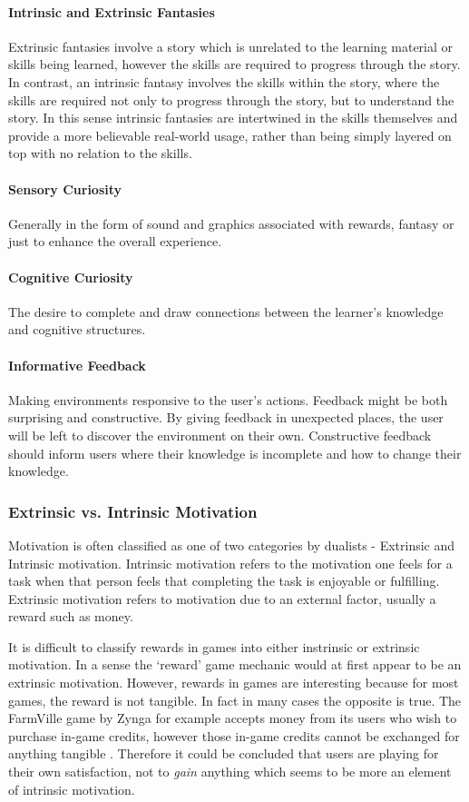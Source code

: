 \paragraph{Intrinsic and Extrinsic Fantasies}
Extrinsic fantasies involve a story which is unrelated to the learning material
or skills being learned, however the skills are required to progress through the
story. In contrast, an intrinsic fantasy involves the skills within the story,
where the skills are required not only to progress through the story, but to
understand the story. In this sense intrinsic fantasies are intertwined in the
skills themselves and provide a more believable real-world usage, rather than 
being simply layered on top with no relation to the skills.
\paragraph{Sensory Curiosity}
Generally in the form of sound and graphics associated with rewards, fantasy or
just to enhance the overall experience.
\paragraph{Cognitive Curiosity}
The desire to complete and draw connections between the learner's knowledge and
cognitive structures.
\paragraph{Informative Feedback} Making environments responsive to the user's actions.
Feedback might be both surprising and constructive. By giving feedback in unexpected
places, the user will be left to discover the environment on their own. Constructive
feedback should inform users where their knowledge is incomplete and how to change
their knowledge.
\subsubsection{Extrinsic vs. Intrinsic Motivation}
Motivation is often classified as one of two categories by dualists - Extrinsic and Intrinsic motivation. Intrinsic motivation refers to the motivation one feels for a task when that person feels that completing the task is enjoyable or fulfilling. Extrinsic motivation refers to motivation due to an external factor, usually a reward such as money.

It is difficult to classify
rewards in games into either instrinsic or extrinsic motivation. In a sense the 
`reward' game mechanic would at first appear to be an extrinsic motivation.
However, rewards in games are interesting because for most games, the reward is not tangible.
In fact in many cases the opposite is true.
The FarmVille game by Zynga for example accepts money from its users who wish to purchase
in-game credits, however those in-game credits cannot be exchanged for anything
tangible \cite{gabe_zichermann_fun_2010}. Therefore it could be concluded that
users are playing for their own satisfaction, not to \textit{gain} anything which
seems to be more an element of intrinsic motivation.

